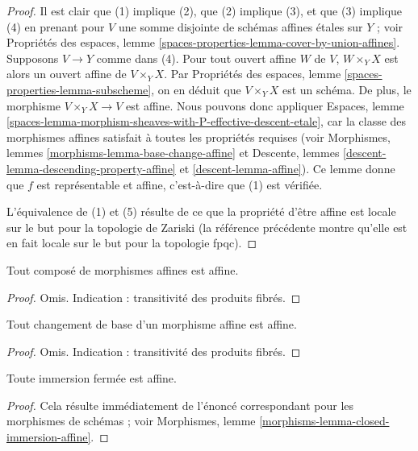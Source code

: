\begin{proof}
Il est clair que (1) implique (2), que (2) implique (3), et que
(3) implique (4) en prenant pour $V$ une somme disjointe de schémas affines
étales sur $Y$ ; voir Propriétés des espaces,
lemme \ref{spaces-properties-lemma-cover-by-union-affines}.
Supposons $V \to Y$ comme dans (4). Pour tout ouvert affine $W$ de $V$,
$W \times_Y X$ est alors un ouvert affine de $V \times_Y X$. Par
Propriétés des espaces, lemme \ref{spaces-properties-lemma-subscheme},
on en déduit que $V \times_Y X$ est un schéma. De plus, le morphisme
$V \times_Y X \to V$ est affine. Nous pouvons donc appliquer
Espaces,
lemme \ref{spaces-lemma-morphism-sheaves-with-P-effective-descent-etale},
car la classe des morphismes affines satisfait à toutes les propriétés
requises (voir
Morphismes, lemmes \ref{morphisms-lemma-base-change-affine} et
Descente, lemmes \ref{descent-lemma-descending-property-affine}
et \ref{descent-lemma-affine}). Ce lemme donne
que $f$ est représentable et affine, c'est-à-dire que (1) est vérifiée.

\medskip\noindent
L'équivalence de (1) et (5) résulte de ce que la propriété
d'être affine est locale sur le but pour la topologie de Zariski (la référence précédente montre
qu'elle est en fait locale sur le but pour la topologie fpqc).
\end{proof}

\begin{lemma}
\label{lemma-composition-affine}
Tout composé de morphismes affines est affine.
\end{lemma}

\begin{proof}
Omis. Indication : transitivité des produits fibrés.
\end{proof}

\begin{lemma}
\label{lemma-base-change-affine}
Tout changement de base d'un morphisme affine est affine.
\end{lemma}

\begin{proof}
Omis. Indication : transitivité des produits fibrés.
\end{proof}

\begin{lemma}
\label{lemma-closed-immersion-affine}
Toute immersion fermée est affine.
\end{lemma}

\begin{proof}
Cela résulte immédiatement de l'énoncé correspondant pour les morphismes de
schémas ; voir Morphismes, lemme \ref{morphisms-lemma-closed-immersion-affine}.
\end{proof}


